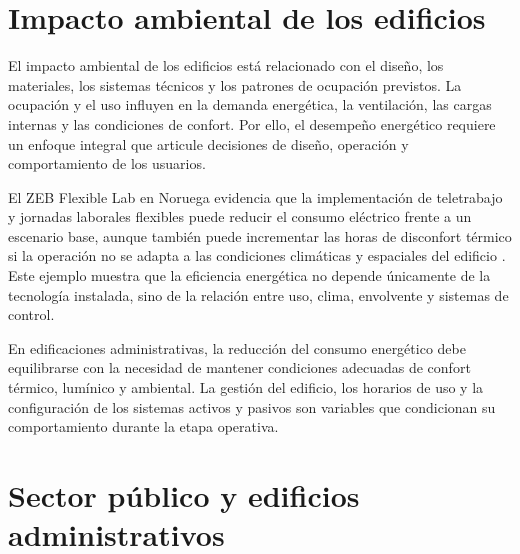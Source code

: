 \section{Impacto ambiental de los edificios}

\begin{textoDosTercios}

El impacto ambiental de los edificios está relacionado con el diseño, los materiales, los sistemas técnicos y los patrones de ocupación previstos. La ocupación y el uso influyen en la demanda energética, la ventilación, las cargas internas y las condiciones de confort. Por ello, el desempeño energético requiere un enfoque integral que articule decisiones de diseño, operación y comportamiento de los usuarios.

El ZEB Flexible Lab en Noruega evidencia que la implementación de teletrabajo y jornadas laborales flexibles puede reducir el consumo eléctrico frente a un escenario base, aunque también puede incrementar las horas de disconfort térmico si la operación no se adapta a las condiciones climáticas y espaciales del edificio \parencite{norouziasasImpactSpaceUtilization2024}. Este ejemplo muestra que la eficiencia energética no depende únicamente de la tecnología instalada, sino de la relación entre uso, clima, envolvente y sistemas de control.

En edificaciones administrativas, la reducción del consumo energético debe equilibrarse con la necesidad de mantener condiciones adecuadas de confort térmico, lumínico y ambiental. La gestión del edificio, los horarios de uso y la configuración de los sistemas activos y pasivos son variables que condicionan su comportamiento durante la etapa operativa.

\end{textoDosTercios}


\section{Sector público y edificios administrativos}

